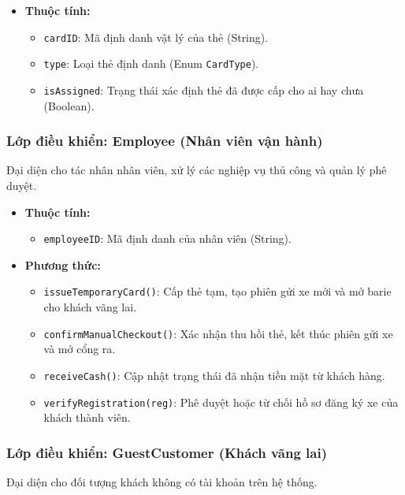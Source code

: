 \begin{itemize}
    \item \textbf{Thuộc tính:}
    \begin{itemize}
        \item \texttt{cardID}: Mã định danh vật lý của thẻ (String).
        \item \texttt{type}: Loại thẻ định danh (Enum \texttt{CardType}).
        \item \texttt{isAssigned}: Trạng thái xác định thẻ đã được cấp cho ai hay chưa (Boolean).
    \end{itemize}
\end{itemize}

\subsubsection{Lớp điều khiển: Employee (Nhân viên vận hành)}
Đại diện cho tác nhân nhân viên, xử lý các nghiệp vụ thủ công và quản lý phê duyệt.

\begin{itemize}
    \item \textbf{Thuộc tính:}
    \begin{itemize}
        \item \texttt{employeeID}: Mã định danh của nhân viên (String).
    \end{itemize}
    \item \textbf{Phương thức:}
    \begin{itemize}
        \item \texttt{issueTemporaryCard()}: Cấp thẻ tạm, tạo phiên gửi xe mới và mở barie cho khách vãng lai.
        \item \texttt{confirmManualCheckout()}: Xác nhận thu hồi thẻ, kết thúc phiên gửi xe và mở cổng ra.
        \item \texttt{receiveCash()}: Cập nhật trạng thái đã nhận tiền mặt từ khách hàng.
        \item \texttt{verifyRegistration(reg)}: Phê duyệt hoặc từ chối hồ sơ đăng ký xe của khách thành viên.
    \end{itemize}
\end{itemize}

\subsubsection{Lớp điều khiển: GuestCustomer (Khách vãng lai)}
Đại diện cho đối tượng khách không có tài khoản trên hệ thống.

